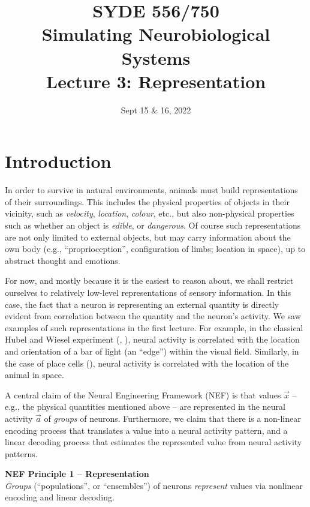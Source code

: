 \documentclass[10pt,letterpaper,oneside]{article}
\date{Sept 15 \& 16, 2022}
\title{SYDE 556/750 \\ Simulating Neurobiological Systems \\ Lecture 3: Representation}
\begin{document}

\section{Introduction}


In order to survive in natural environments, animals must build representations of their surroundings. This includes the physical properties of objects in their vicinity, such as \emph{velocity}, \emph{location}, \emph{colour}, etc., but also non-physical properties such as whether an object is \emph{edible}, or \emph{dangerous}. Of course such representations are not only limited to external objects, but may carry information about the own body (e.g., \enquote{proprioception}, configuration of limbs; location in space), up to abstract thought and emotions.

For now, and mostly because it is the easiest to reason about, we shall restrict ourselves to relatively low-level representations of sensory information. In this case, the fact that a neuron is representing an external quantity is directly evident from correlation between the quantity and the neuron's activity.  We saw examples of such representations in the first lecture. For example, in the classical Hubel and Wiesel experiment (, \cite{hubel1959receptive}), neural activity is correlated with the location and orientation of a bar of light (an \enquote{edge}) within the visual field. Similarly, in the case of place cells (), neural activity is correlated with the location of the animal in space.

A central claim of the Neural Engineering Framework (NEF) is that values $\vec x$ -- e.g., the physical quantities mentioned above -- are represented in the neural activity $\vec a$ of \emph{groups} of neurons. Furthermore, we claim that there is a non-linear encoding process that translates a value into a neural activity pattern, and a linear decoding process that estimates the represented value from neural activity patterns.

\begin{mdframed}
\textbf{NEF Principle 1 -- Representation}\\
\emph{Groups} (\enquote{populations}, or \enquote{ensembles}) of neurons \emph{represent} values via nonlinear encoding and linear decoding.
\end{mdframed}
\end{document}
